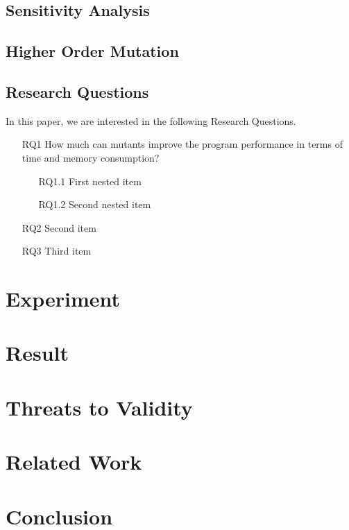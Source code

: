 \documentclass[oribibl]{llncs}
\begin{document}
\subsection{Sensitivity Analysis}
\label{sec_sensitivity}

\subsection{Higher Order Mutation}
\label{sec_hom}

\subsection{Research Questions}
\label{sec_rqs}
In this paper, we are interested in the following Research Questions.

\begin{enumerate}
\item[RQ1] How much can mutants improve the program performance in terms of time and memory consumption?
 \begin{enumerate}
\item[RQ1.1] First nested item
\item[RQ1.2] Second nested item
\end{enumerate}
\item[RQ2] Second item
\item[RQ3] Third item
\end{enumerate}

\section{Experiment}
\label{sec_exp}

\section{Result}
\label{sec_result}

\section{Threats to Validity}
\label{sec_threat}

\section{Related Work}
\label{sec_related}

\section{Conclusion}
\label{sec_conclusion}


   
\end{document}
